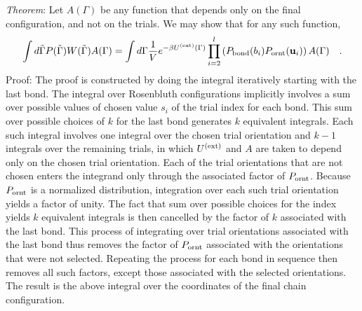 \documentclass[12pt]{article} %
\newcommand{\vv}[1]{\mathbf{#1}}
\newcommand\chain{\Gamma}
\newcommand\Uext{U^{({\rm ext})}}
\newcommand\nbead{l}
\newcommand\ubond{\vv{u}}
\newcommand\rbond{b}
\newcommand\Pbond{P_{{\rm bond}}}
\newcommand\Pornt{P_{{\rm ornt}}}
\newcommand\rconfig{\tilde{\chain}}
\begin{document}
{\it Theorem}: Let $A(\Gamma)$ be any function that depends only on the final 
configuration, and not on the trials. We may show that for any such function,
\begin{equation}
    \int d\rconfig P(\rconfig)W(\rconfig) A(\chain) = 
    \int d\chain \frac{1}{V} e^{-\beta\Uext(\chain)}
                 \prod_{i=2}^{\nbead} \left ( \Pbond(\rbond_{i}) \Pornt(\ubond_{i}) \right )
                 A(\chain) \quad.
\end{equation}
Proof: The proof is constructed by doing the integral iteratively starting with
the last bond. The integral over Rosenbluth configurations implicitly involves a
sum over possible values of chosen value $s_{i}$ of the trial index for each bond.
This sum over possible choices of $k$ for the last bond generates $k$ equivalent 
integrals. Each such integral involves one integral over the chosen trial orientation
and $k-1$ integrals over the remaining trials, in which $\Uext$ and $A$ are taken
to depend only on the chosen trial orientation. Each of the trial orientations that 
are not chosen enters the integrand only through the associated factor of 
$\Pornt$. Because $\Pornt$ is a normalized distribution, integration over each
such trial orientation yields a factor of unity. The fact that sum over possible
choices for the index yields $k$ equivalent integrals is then cancelled by the
factor of $k$ associated with the last bond. This process of integrating over
trial orientations associated with the last bond thus removes the factor of
$\Pornt$ associated with the orientations that were not selected. Repeating
the process for each bond in sequence then removes all such factors, except
those associated with the selected orientations. The result is the above integral
over the coordinates of the final chain configuration.
\end{document}
